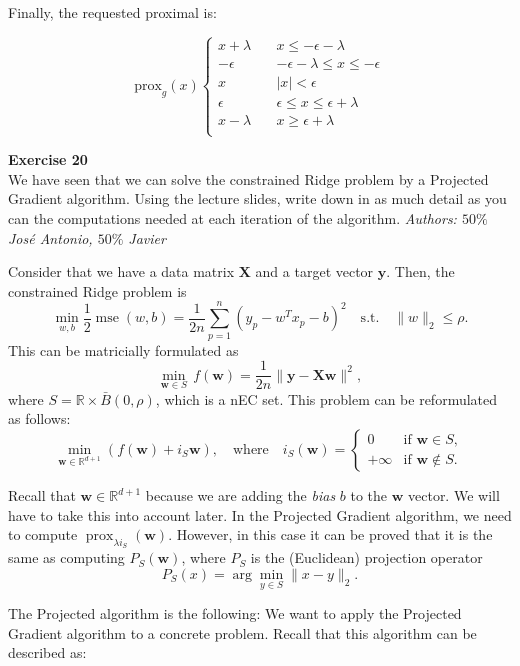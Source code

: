 \documentclass[11pt,table]{article}
\newenvironment{problem}[2][Exercise]
{ \begin{mdframed}[backgroundcolor=gray!20] \textbf{#1 #2} \\}
	{\hspace{0.0cm}\newline\newline \emph{Authors: \(50\%\) José Antonio, \(50\%\) Javier}  \end{mdframed}}
\newcommand\R{\mathbb R}
\begin{document}
Finally, the requested proximal is:

\[
	\text{prox}_g(x) \begin{cases}
		x + \lambda \quad & x \le -\epsilon-\lambda               \\
		-\epsilon \quad   & -\epsilon-\lambda \le x \le -\epsilon \\
		x \quad           & |x| < \epsilon                        \\
		\epsilon \quad    & \epsilon \le x \le \epsilon+\lambda   \\
		x-\lambda \quad   & x \ge \epsilon+\lambda                \\
	\end{cases}
\]

\begin{problem}{20}
We have seen that we can solve the constrained Ridge problem by a Projected Gradient algorithm. Using the lecture slides, write down in as much detail as you can the computations needed at each iteration of the algorithm.
\end{problem}

Consider that we have a data matrix \(\mathbf{X}\) and a target vector \(\mathbf{y}\). Then, the constrained Ridge problem is
\[
	\min_{w,b}\frac{1}{2} \operatorname{mse}(w,b)= \frac{1}{2n}\sum_{p=1}^n (y_p-w^Tx_p-b)^2 \quad \text{s.t.} \quad \|w\|_2\leq \rho.
\]
This can be matricially formulated as
\[
	\min_{\mathbf{w}\in S} \, f(\mathbf{ w})=\frac{1}{2n}\|\mathbf{y} - \mathbf{Xw}\|^2,
\]
where $S=\mathbb R \times \bar B(0, \rho)$, which is a nEC set. This problem can be reformulated as follows:
\[
	\min_{\mathbf{w} \in \mathbb R^{d+1}} \left(f(\mathbf{w}) + i_S\mathbf{w}\right), \quad \text{where} \quad i_S(\mathbf{w})=\begin{cases}0 & \text{if } \mathbf{w}\in S,\\ +\infty & \text{if } \mathbf{w} \notin S.\end{cases}
\]

Recall that \(\mathbf{w}\in \R^{d+1}\) because we are adding the \emph{bias} \(b\) to the \(\mathbf{w}\) vector. We will have to take this into account later. In the Projected Gradient algorithm, we need to compute  $\operatorname{prox}_{\lambda i_S}(\mathbf{w})$. However, in this case it can be proved that it is the same as computing $P_S(\mathbf{w})$, where $P_S$ is the (Euclidean) projection operator
\[
	P_S(x)=\arg\min_{y\in S} \|x-y\|_2.
\]

The Projected algorithm is the following:
We want to apply the Projected Gradient algorithm to a concrete problem. Recall that this algorithm can be described as:
\end{document}
